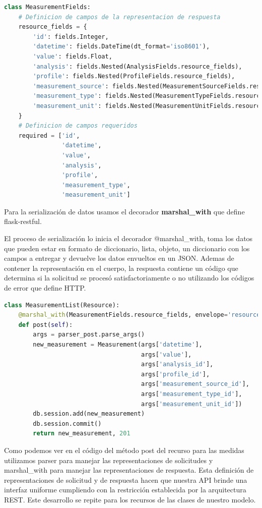 \begin{lstlisting}[language=Python]
class MeasurementFields:
    # Definicion de campos de la representacion de respuesta
    resource_fields = {
        'id': fields.Integer,
        'datetime': fields.DateTime(dt_format='iso8601'),
        'value': fields.Float,
        'analysis': fields.Nested(AnalysisFields.resource_fields),
        'profile': fields.Nested(ProfileFields.resource_fields),
        'measurement_source': fields.Nested(MeasurementSourceFields.resource_fields),
        'measurement_type': fields.Nested(MeasurementTypeFields.resource_fields),
        'measurement_unit': fields.Nested(MeasurementUnitFields.resource_fields),
    }
    # Definicion de campos requeridos
    required = ['id',
                'datetime',
                'value',
                'analysis',
                'profile',
                'measurement_type',
                'measurement_unit']
\end{lstlisting}

Para la serialización de datos usamos el decorador \textbf{marshal\_with} que define flask-restful.

El proceso de serialización lo inicia el decorador @marshal\_with, toma los datos que pueden estar en formato de diccionario, lista, objeto, un diccionario con los campos a entregar y devuelve los datos envueltos en un JSON. Ademas de contener la representación en el cuerpo, la respuesta contiene un código que determina si la solicitud se procesó satisfactoriamente o no utilizando los códigos de error que define HTTP.

\begin{lstlisting}[language=Python]
class MeasurementList(Resource):
    @marshal_with(MeasurementFields.resource_fields, envelope='resource')
    def post(self):
        args = parser_post.parse_args()
        new_measurement = Measurement(args['datetime'],
                                      args['value'],
                                      args['analysis_id'],
                                      args['profile_id'],
                                      args['measurement_source_id'],
                                      args['measurement_type_id'],
                                      args['measurement_unit_id'])
        db.session.add(new_measurement)
        db.session.commit()
        return new_measurement, 201
\end{lstlisting}

 Como podemos ver en el código del método post del recurso para las medidas utilizamos parser para manejar las representaciones de solicitudes y marshal\_with para manejar las representaciones de respuesta. Esta definición de representaciones de solicitud y de respuesta hacen que nuestra API brinde una interfaz uniforme cumpliendo con la restricción establecida por la arquitectura REST. 
 Este desarrollo se repite para los recursos de las clases de nuestro modelo.

